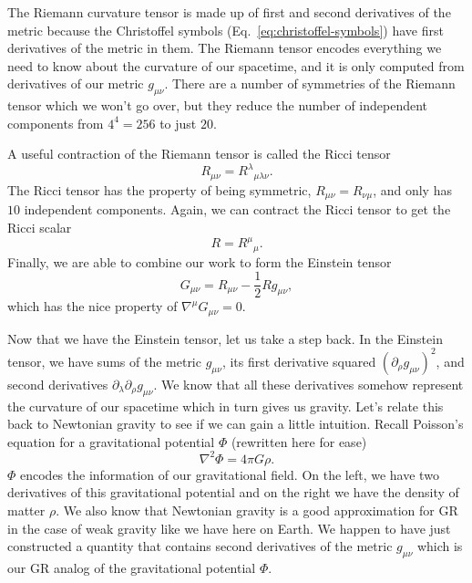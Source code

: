 \begin{bibunit}[unsrtnat]
The Riemann curvature tensor is made up of first and second derivatives of the
metric because the Christoffel symbols (Eq.~\ref{eq:christoffel-symbols}) have
first derivatives of the metric in them. The Riemann tensor encodes everything
we need to know about the curvature of our spacetime, and it is only computed
from derivatives of our metric $g_{\mu\nu}$. There are a number of symmetries of
the Riemann tensor which we won't go over, but they reduce the number of
independent components from $4^4=256$ to just $20$.

A useful contraction of the Riemann tensor is called the Ricci tensor
\begin{equation}\label{eq:ricci-tensor}
   R_{\mu\nu} = {R^\lambda}_{\mu\lambda\nu}.
\end{equation}
The Ricci tensor has the property of being symmetric, $R_{\mu\nu} = R_{\nu\mu}$,
and only has $10$ independent components. Again, we can contract the Ricci
tensor to get the Ricci scalar
\begin{equation}\label{eq:ricci-scalar}
   R = {R^\mu}_{\mu}.
\end{equation}
Finally, we are able to combine our work to form the Einstein tensor
\begin{equation}
   G_{\mu\nu} = R_{\mu\nu} - \frac{1}{2}Rg_{\mu\nu},
\end{equation}
which has the nice property of $\nabla^\mu G_{\mu\nu} = 0$.

Now that we have the Einstein tensor, let us take a step back. In the Einstein
tensor, we have sums of the metric $g_{\mu\nu}$, its first derivative squared
$(\partial_\rho g_{\mu\nu})^2$, and second derivatives
$\partial_\lambda\partial_\rho g_{\mu\nu}$. We know that all these derivatives
somehow represent the curvature of our spacetime which in turn gives us gravity.
Let's relate this back to Newtonian gravity to see if we can gain a little
intuition. Recall  Poisson's equation for a gravitational
potential $\Phi$ (rewritten here for ease)
\begin{equation}
   \nabla^2\Phi = 4\pi G\rho .
\end{equation}
$\Phi$ encodes the information of our gravitational field. On the left, we have
two derivatives of this gravitational potential and on the right we have the
density of matter $\rho$. We also know that Newtonian gravity is a good
approximation for GR in the case of weak gravity like we have here on Earth.
We happen to have just constructed a quantity that contains second derivatives
of the metric $g_{\mu\nu}$ which is our GR analog of the gravitational potential
$\Phi$.


\end{bibunit}
